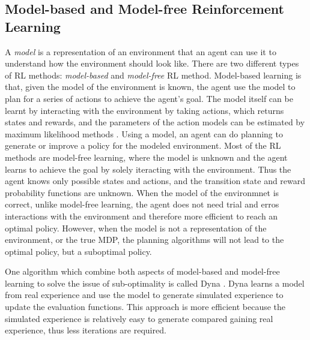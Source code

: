 \documentclass[12pt,twoside]{report}
\theoremstyle{plain}
\theoremstyle{definition}
\DeclareMathOperator{\E}{\mathbb{E}}
\begin{document}

%
%
%
%

\subsection{Model-based and Model-free Reinforcement Learning}
\label{model_base_model_free_subsection}
A \textit{model} is a representation of an environment that an agent can use it to understand how the environment should look like. There are two different types of RL methods: \textit{model-based} and \textit{model-free} RL method. 
 Model-based learning is that, given the model of the environment is known, the agent use the model to plan for a series of actions to achieve the agent's goal. 
The model itself can be learnt by interacting with the environment by taking actions, which returns states and rewards, and the parameters of the action models can be estimated by maximum likelihood methods \cite{Ray2010}.
Using a model, an agent can do planning to generate or improve a policy for the modeled environment. 
Most of the RL methods are model-free learning, where the model is unknown and the agent learns to achieve the goal by solely iteracting with the environment. Thus the agent knows only possible states and actions, and the transition state and reward probability functions are unknown.
When the model of the environmnet is correct, unlike model-free learning, the agent does not need trial and erros interactions with the environment and therefore more efficient to reach an optimal policy. 
However, when the model is not a representation of the environment, or the true MDP, the planning algorithms will not lead to the optimal policy, but a suboptimal policy.

One algorithm which combine both aspects of model-based and model-free learning to solve the issue of sub-optimality is called Dyna \cite{Sutton1990}.
Dyna learns a model from real experience and use the model to generate simulated experience to update the evaluation functions.
This approach is more efficient because the simulated experience is relatively easy to generate compared gaining real experience, thus less iterations are required.
\end{document}
